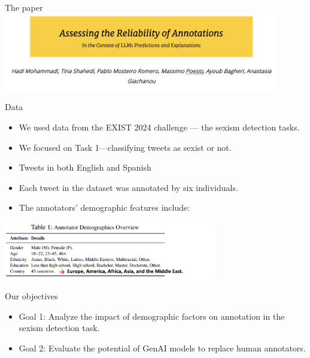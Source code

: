 \documentclass[t,xcolor={dvipsnames},final,aspectratio=169]{beamer}
\begin{document}
\begin{frame}{The paper}
\includegraphics[width=0.9\textwidth]{img/credit.png}
\end{frame}

\begin{frame}{Data}
\begin{itemize}
\item We used data from the EXIST 2024 challenge — the sexism detection tasks.
\item  We focused on Task 1—classifying tweets as sexist or not.
\item Tweets in both English and Spanish
\item Each tweet in the dataset was annotated by six individuals.
\item The annotators' demographic features include:
\end{itemize}
\begin{center}
\includegraphics[width=0.7\textwidth]{img/demographics.png}
\end{center}
\end{frame}

\begin{frame}{Our objectives}
\begin{itemize}
\item Goal 1: Analyze the impact of demographic factors on annotation in the sexism detection task. 

\item Goal 2: Evaluate the potential of GenAI models to replace human annotators. 
\end{itemize}
\end{frame}
\end{document}
